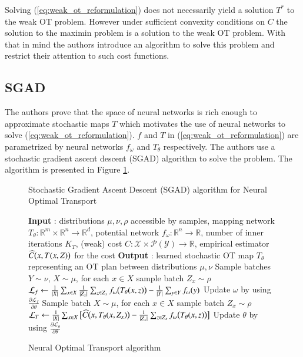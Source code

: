 \documentclass[11pt]{article}
\begin{document}
Solving (\ref{eq:weak_ot_reformulation}) does not necessarily yield a solution $T^*$ to the weak OT problem. However under sufficient convexity conditions on $C$ the solution to the maximin problem is a solution to the weak OT problem. With that in mind the authors introduce an algorithm to solve this problem and restrict their attention to such cost functions.

\subsection{SGAD}

The authors prove that the space of neural networks is rich enough to approximate stochastic maps $T$ which motivates the use of neural networks to solve (\ref{eq:weak_ot_reformulation}). $f$ and $T$ in (\ref{eq:weak_ot_reformulation}) are parametrized by neural networks $f_{\omega}$ and $T_{\theta}$ respectively. The authors use a stochastic gradient ascent descent (SGAD) algorithm to solve the problem. The algorithm is presented in Figure \ref{fig:sgad}.

\begin{figure}[H]
    \begin{algorithm}[H]
        \caption{Stochastic Gradient Ascent Descent (SGAD) algorithm for Neural Optimal Transport}
        \begin{algorithmic}[1]
            \State \textbf{Input} : distributions $\mu,\nu,\rho$ accessible by samples, mapping network $T_{\theta}:\mathbb{R}^{m}\times\mathbb{R}^{n}\rightarrow\mathbb{R}^{d}$, potential network $f_{\omega}:\mathbb{R}^{n}\rightarrow\mathbb{R}$, number of inner iterations $K_{T}$, (weak) cost $C:\mathcal{X}\times\mathcal{P}(\mathcal{Y})\rightarrow\mathbb{R}$, empirical estimator $\widehat{C}\big{(}x,T(x,Z)\big{)}$ for the cost
            \State \textbf{Output} : learned stochastic OT map $T_{\theta}$ representing an OT plan between distributions $\mu,\nu$
            \Repeat
            \State Sample batches $Y\sim\nu$, $X\sim\mu$, for each $x\in X$ sample batch $Z_{x}\sim\rho$
            \State $\mathcal{L}_{f}\leftarrow\frac{1}{|X|}\sum_{x\in X}\frac{1}{|Z_{x}|}\sum_{z \in Z_{x}}f_{\omega}\big{(}T_{\theta}(x,z)\big{)}-\frac{1}{|Y|}\sum_{y\in Y}f_{ \omega}(y)$
            \State Update $\omega$ by using $\frac{\partial\mathcal{L}_{f}}{\partial\theta}$
            \State Sample batch $X\sim\mu$, for each $x\in X$ sample batch $Z_{x}\sim\rho$
            \State $\mathcal{L}_{T}\leftarrow\frac{1}{|X|}\sum_{x\in X}\big{[}\widehat{C}\big{(}x,T_{\theta}(x,Z_{x})\big{)}-\frac{1}{|Z_{x}|}\sum_{z\in Z_{x}}f_{\omega}\big{(} T_{\theta}(x,z)\big{)}\big{]}$
            \State Update $\theta$ by using $\frac{\partial\mathcal{L}_{\theta}}{\partial\theta}$
            \EndFor
        \end{algorithmic}
    \end{algorithm}
    \caption{Neural Optimal Transport algorithm \cite{korotin-2022}}
    \label{fig:sgad}
\end{figure}
\end{document}
